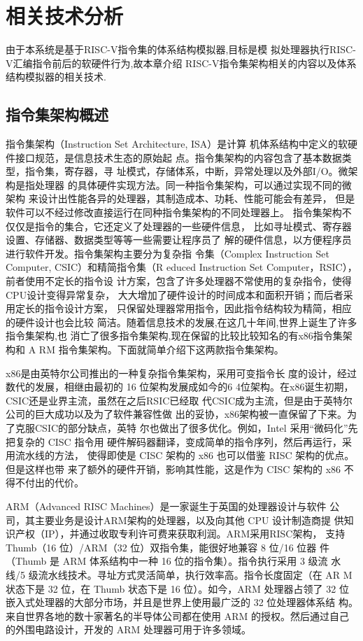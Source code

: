 
\chapter{相关技术分析}

由于本系统是基于RISC-V指令集的体系结构模拟器,目标是模
拟处理器执行RISC-V汇编指令前后的软硬件行为,故本章介绍
RISC-V指令集架构相关的内容以及体系结构模拟器的相关技术.

\section{指令集架构概述}

指令集架构（Instruction Set Architecture, ISA）是计算
机体系结构中定义的软硬件接口规范，是信息技术生态的原始起
点。指令集架构的内容包含了基本数据类型，指令集，寄存器，寻
址模式，存储体系，中断，异常处理以及外部I/O。微架构是指处理器
的具体硬件实现方法。同一种指令集架构，可以通过实现不同的微架构
来设计出性能各异的处理器，其制造成本、功耗、性能可能会有差异，
但是软件可以不经过修改直接运行在同种指令集架构的不同处理器上。
 指令集架构不仅仅是指令的集合，它还定义了处理器的一些硬件信息，
 比如寻址模式、寄存器设置、存储器、数据类型等等一些需要让程序员了
 解的硬件信息，以方便程序员进行软件开发。指令集架构主要分为复杂指
 令集（Complex Instruction Set Computer, CSIC）和精简指令集（R
 educed Instruction Set Computer，RSIC），前者使用不定长的指令设
 计方案，包含了许多处理器不常使用的复杂指令，使得CPU设计变得异常复杂，
 大大增加了硬件设计的时间成本和面积开销；而后者采用定长的指令设计方案，
 只保留处理器常用指令，因此指令结构较为精简，相应的硬件设计也会比较
 简洁。随着信息技术的发展,在这几十年间,世界上诞生了许多指令集架构,也
 消亡了很多指令集架构,现在保留的比较比较知名的有x86指令集架构和 A
 RM 指令集架构。下面就简单介绍下这两款指令集架构。


x86是由英特尔公司推出的一种复杂指令集架构，采用可变指令长
度的设计，经过数代的发展，相继由最初的 16 位架构发展成如今的6
4位架构。在x86诞生初期，CSIC还是业界主流，虽然在之后RSIC已经取
代CSIC成为主流，但是由于英特尔公司的巨大成功以及为了软件兼容性做
出的妥协，x86架构被一直保留了下来。为了克服CSIC的部分缺点，英特
尔也做出了很多优化。例如，Intel 采用“微码化”先把复杂的 CISC 指令用
硬件解码器翻译，变成简单的指令序列，然后再运行，采用流水线的方法，
使得即使是 CISC 架构的 x86 也可以借鉴 RISC 架构的优点。但是这样也带
来了额外的硬件开销，影响其性能，这是作为 CISC 架构的 x86 不得不付出的代价。


ARM（Advanced RISC Machines）是一家诞生于英国的处理器设计与软件
公司，其主要业务是设计ARM架构的处理器，以及向其他 CPU 设计制造商提
供知识产权（IP），并通过收取专利许可费来获取利润。ARM采用RISC架构，
支持 Thumb（16 位）/ARM（32 位）双指令集，能很好地兼容 8 位/16 位器
件（Thumb 是 ARM 体系结构中一种 16 位的指令集）。指令执行采用 3 级流
水线/5 级流水线技术。寻址方式灵活简单，执行效率高。指令长度固定（在 AR
M 状态下是 32 位，在 Thumb 状态下是 16 位）。如今，ARM 处理器占领了 32 位
嵌入式处理器的大部分市场，并且是世界上使用最广泛的 32 位处理器体系结
构。来自世界各地的数十家著名的半导体公司都在使用 ARM 的授权。然后通过自己
的外围电路设计，开发的 ARM 处理器可用于许多领域。

